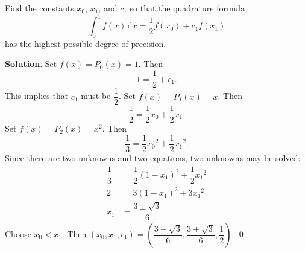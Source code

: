 \documentclass[11pt]{article}
\theoremstyle{break}
\newcommand{\ddi}{\text{$\,$d}}
\numberwithin{equation}{theorem}
\begin{document}
\newpage
\begin{problem}\label{problem 7} %
    Find the constants $x_0$, $x_1$, and $c_1$ so that the quadrature formula $$\int_0^1f(x)\ddi x=\dfrac{1}{2}f(x_0)+c_1f(x_1)$$ has the highest possible degree of precision.
\end{problem}
\textbf{Solution}. Set $f(x)=P_0(x)=1$. Then $$1=\dfrac{1}{2}+c_1.$$ This implies that $c_1$ must be $\dfrac{1}{2}$. Set $f(x)=P_1(x)=x$. Then $$\dfrac{1}{2}=\dfrac{1}{2}x_0+\dfrac{1}{2}x_1.$$ Set $f(x)=P_2(x)=x^2$. Then $$\dfrac{1}{3}=\dfrac{1}{2}{x_0}^2+\dfrac{1}{2}{x_1}^2.$$ Since there are two unknowns and two equations, two unknowns may be solved: \begin{align*}
    \dfrac{1}{3}&=\dfrac{1}{2}\left(1-x_1\right)^2+\dfrac{1}{2}{x_1}^2\\
    2&=3(1-x_1)^2+3{x_1}^2\\
    x_1&=\dfrac{3\pm\sqrt{3}}{6}.
\end{align*}
Choose $x_0<x_1$. Then $(x_0, x_1, c_1)=\left(\dfrac{3-\sqrt{3}}{6}, \dfrac{3+\sqrt{3}}{6}, \dfrac{1}{2}\right)$. \qed
\end{document}
